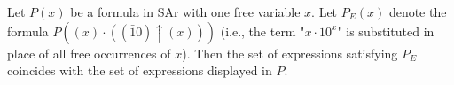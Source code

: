 Let $P(x)$ be a formula in SAr with one free variable $x$. Let $P_E(x)$ denote the formula $P((x) \cdot ((\bar{1}0) \uparrow (x)))$ (i.e., the term "$x \cdot 10^x$" is substituted in place of all free occurrences of $x$). Then the set of expressions satisfying $P_E$ coincides with the set of expressions displayed in $P$.
